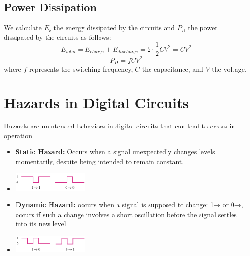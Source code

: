 \documentclass[12pt,openany, tikz,border=10pt]{book}
\begin{document}
			      	\subsection{Power Dissipation}
			      	
			      	We calculate $E_c$ the energy dissipated by the circuits and $P_D$ the power dissipated by the circuits as follows:
			      	\begin{equation}
			      		E_{total} = E_{charge} + E_{discharge} = 2 \cdot \frac{1}{2}CV^2 = CV^2
			      	\end{equation}
			      	\begin{equation}
			      		P_D = fCV^2
			      	\end{equation}
			      	where $f$ represents the switching frequency, $C$ the capacitance, and $V$ the voltage. 
			      	
			      	\section{Hazards in Digital Circuits}
			      	
			      	Hazards are unintended behaviors in digital circuits that can lead to errors in operation:
			      	\begin{itemize}
			      		\item[] \textbf{Static Hazard:} Occurs when a signal unexpectedly changes levels momentarily, despite being intended to remain constant.
			      		\item[] 
			      		      \begin{center}
                                \includegraphics[width=0.3\textwidth]{circuits/9.5.png}

                              \end{center}
			      		             
			      		        
        
			      		\item[] \textbf{Dynamic Hazard:} occurs
			      		      when a signal is supposed to
			      		      change: 1\;→ or 0\;→, occurs if such a change
			      		      involves a short oscillation before
			      		      the signal settles into its new level.
			      		\item[] 
			      		      \centering
			      		      \includegraphics[width=0.3\textwidth]{circuits/9.5_1.png}
			      	\end{itemize}
			      	
\end{document}
